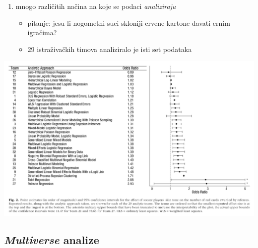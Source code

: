 \documentclass[aspectratio=169]{beamer}
\newcounter{saveenumi}
\newcommand{\conti}{\setcounter{enumi}{\value{saveenumi}}}
\newcommand{\tinycitep}[1]{%
    \bgroup
    \scriptsize
    \citep{#1}
    \egroup}
\begin{document}
\begin{frame}
    \begin{enumerate}
        \conti

        \item mnogo različitih načina na koje se podaci \emph{analiziraju}
            \tinycitep{silberzahnManyAnalystsOne2018}

            \begin{itemize}
                \item pitanje: jesu li nogometni suci skloniji crvene kartone
                    davati crnim igračima?

                \pause

                \item 29 istraživačkih timova analiziralo je isti set
                    podataka

            \end{itemize}

    \end{enumerate}
\end{frame}

\begin{frame}
    \begin{center}
        \includegraphics[scale=0.35]{silberzahn.pdf}
    \end{center}
\end{frame}

\subsection{\textit{Multiverse} analize}
\end{document}
